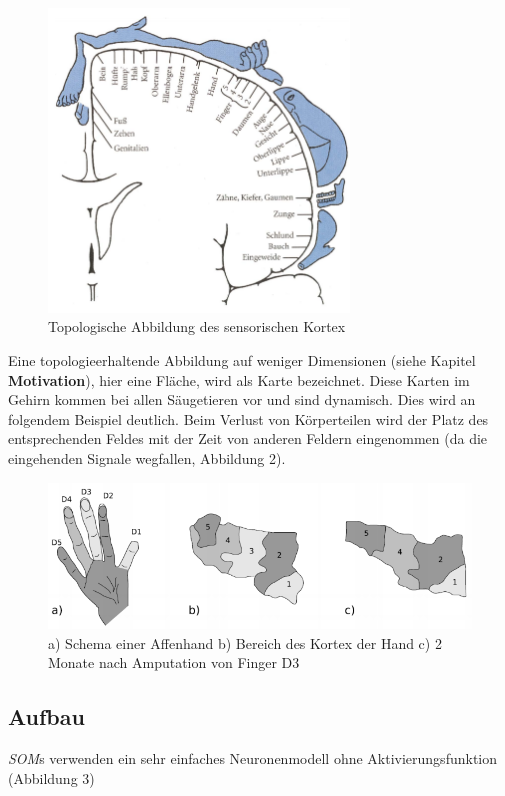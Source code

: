 \documentclass[11pt]{article}
\begin{document}
    \begin{figure}[ht!]
        \centering
        \includegraphics[width=8cm]{../../resources/gehirn.png}
        \caption{Topologische Abbildung des sensorischen Kortex}
    \end{figure}
    \newpage

    Eine topologieerhaltende Abbildung auf weniger Dimensionen (siehe Kapitel
    \textbf{Motivation}), hier eine Fläche, wird als Karte bezeichnet. Diese Karten im Gehirn
    kommen bei allen Säugetieren vor und sind dynamisch. Dies wird an folgendem Beispiel deutlich.
    Beim Verlust von Körperteilen wird der Platz des entsprechenden Feldes mit der Zeit von
    anderen Feldern eingenommen (da die eingehenden Signale wegfallen, Abbildung 2).

    \begin{figure}[ht!]
        \centering
        \includegraphics[width=12cm]{../../resources/aufbau.png}
        \caption{a) Schema einer Affenhand b) Bereich des Kortex der Hand c) 2 Monate nach
        Amputation von Finger D3}
    \end{figure}

    \subsection{Aufbau}
    \textit{SOM}s verwenden ein sehr einfaches Neuronenmodell ohne Aktivierungsfunktion
    (Abbildung 3)
\end{document}

